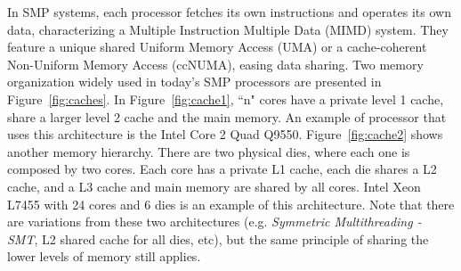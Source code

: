 \documentclass[conference]{IEEEtran}
\begin{document}
In SMP systems, each processor fetches its own instructions and operates its own data, characterizing a Multiple Instruction Multiple Data (MIMD) system. They feature a unique shared Uniform Memory Access (UMA) or a cache-coherent Non-Uniform Memory Access (ccNUMA), easing data sharing. Two memory organization widely used in today's SMP processors are presented in Figure~\ref{fig:caches}. In Figure~\ref{fig:cache1}, ``n" cores have a private level 1 cache, share a larger level 2 cache and the main memory. An example of processor that uses this architecture is the Intel Core 2 Quad Q9550. Figure~\ref{fig:cache2} shows another memory hierarchy. There are two physical dies, where each one is composed by two cores. Each core has a private L1 cache, each die shares a L2 cache, and a L3 cache and main memory are shared by all cores. Intel Xeon L7455 with 24 cores and 6 dies is an example of this architecture. Note that there are variations from these two architectures (e.g. \textit{Symmetric Multithreading - SMT}, L2 shared cache for all dies, etc), but the same principle of sharing the lower levels of memory still applies.
\end{document}
